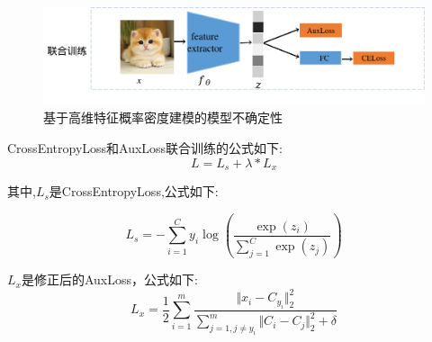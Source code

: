     




\begin{figure}[h]
    \centering
    \includegraphics[width=1.\linewidth]{assets/structure2.png}
    \caption{基于高维特征概率密度建模的模型不确定性}
    \label{tag:模型结构图2}
\end{figure}


CrossEntropyLoss和AuxLoss联合训练的公式如下:
\begin{equation}
    L = L_s+\lambda * L_x
\end{equation}

其中,$L_s$是CrossEntropyLoss,公式如下:

\begin{equation}
    L_s= - \sum_{i=1}^C y_i \log\left(\frac{\exp(z_i)}{\sum_{j=1}^C \exp(z_j)}\right)
\end{equation}

$L_x$是修正后的AuxLoss，公式如下:
\begin{equation}
    L_x = \frac{1}{2}\sum_{i=1}^{m} \frac{\Vert x_i-C_{y_i}\Vert_2^2}{\sum_{j=1,j\neq y_i}^{m}\Vert C_i-C_j\Vert_2^2+\delta}
\end{equation}

